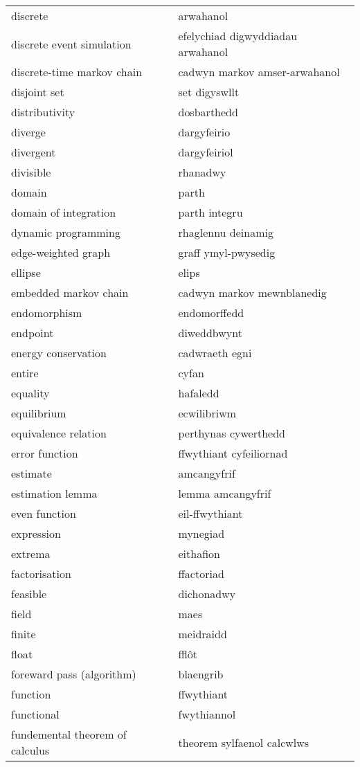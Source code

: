 \begin{supertabular}{p{0.22\textwidth}p{0.22\textwidth}}
discrete & arwahanol \\
discrete event simulation & efelychiad digwyddiadau arwahanol \\
discrete-time markov chain & cadwyn markov amser-arwahanol \\
disjoint set & set digyswllt \\
distributivity & dosbarthedd \\
diverge & dargyfeirio \\
divergent & dargyfeiriol \\
divisible & rhanadwy \\
domain & parth \\
domain of integration & parth integru \\
dynamic programming & rhaglennu deinamig \\
edge-weighted graph & graff ymyl-pwysedig \\
ellipse & elips \\
embedded markov chain & cadwyn markov mewnblanedig \\
endomorphism & endomorffedd \\
endpoint & diweddbwynt \\
energy conservation & cadwraeth egni \\
entire & cyfan \\
equality & hafaledd \\
equilibrium & ecwilibriwm \\
equivalence relation & perthynas cywerthedd \\
error function & ffwythiant cyfeiliornad \\
estimate & amcangyfrif \\
estimation lemma & lemma amcangyfrif \\
even function & eil-ffwythiant \\
expression & mynegiad \\
extrema & eithafion \\
factorisation & ffactoriad \\
feasible & dichonadwy \\
field & maes \\
finite & meidraidd \\
float & fflôt \\
foreward pass (algorithm) & blaengrib \\
function & ffwythiant \\
functional & fwythiannol \\
fundemental theorem of calculus & theorem sylfaenol calcwlws \\

\end{supertabular}
